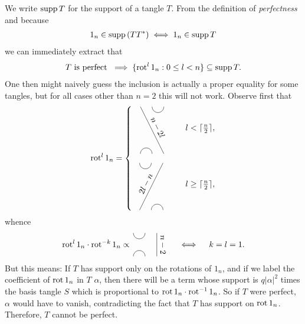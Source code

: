 We write $\operatorname{supp} T$ for the support of a tangle $T$. From the definition of \emph{perfectness} and because 
\begin{align*}
1_n \in \operatorname{supp}{\left( TT^* \right)} \iff 1_n \in \operatorname{supp} T
\end{align*}
we can immediately extract that 
\begin{align*}
T\text{ is perfect } \implies \{\operatorname{rot}^l 1_n : 0\leq l < n\}\subseteq \operatorname{supp} T.
\end{align*}
One then might naively guess the inclusion is actually a proper equality for some tangles, but for all cases other than $n=2$ this will not work. Observe first that
\begin{align*}
\rot^l 1_n = 
\begin{cases}
	\quad\begin{tikzpicture}[scale = 0.5, baseline]
		\draw (-1,2) -- node[above, sloped]{$n-2l$} (1,-2);
		\draw (0,2) arc[start angle=180, end angle=360, radius=5mm];
		\draw (-1,-2) arc[start angle=180, end angle=0, radius=5mm];
	\end{tikzpicture}
	&\quad l < \ceil{\frac{n}{2}},\\[3.5em]
	\hspace*{1.03mm}\begin{tikzpicture}[scale = 0.5, baseline]
		\draw (-1,-2) -- node[above, sloped]{$2l-n$} (1,2);
		\draw (0,-2) arc[start angle=180, end angle=0, radius=5mm];
		\draw (-1,2) arc[start angle=180, end angle=360, radius=5mm];
	\end{tikzpicture}
	&\quad l \geq \ceil{\frac{n}{2}},
\end{cases}
\end{align*}
whence 
\begin{align*}
\rot^l 1_n \cdot \rot^{-k} 1_n \propto\,
\begin{tikzpicture}[scale=0.5, baseline=-1mm]
	\draw (-1,1) arc[start angle=180, end angle=360, radius=5mm];
	\draw (-1,-1) arc[start angle=180, end angle=0, radius=5mm];
	\draw (1,-1) -- node[above, sloped, rotate=180] {$n-2$} (1,1);
\end{tikzpicture}
\quad \iff \quad k = l = 1.
\end{align*}
But this means: If $T$ has support only on the rotations of $1_n$, and if we label the coefficient of $\operatorname{rot} 1_n$ in $T$ $\alpha$, then there will be a term whose support is $q\lvert \alpha \rvert^2$ times the basis tangle $S$ which is proportional to $\operatorname{rot} 1_n \cdot \operatorname{rot}^{-1} 1_n$. So if $T$ were perfect, $\alpha$ would have to vanish, contradicting the fact that $T$ has support on $\operatorname{rot} 1_n$. Therefore, $T$ cannot be perfect.

